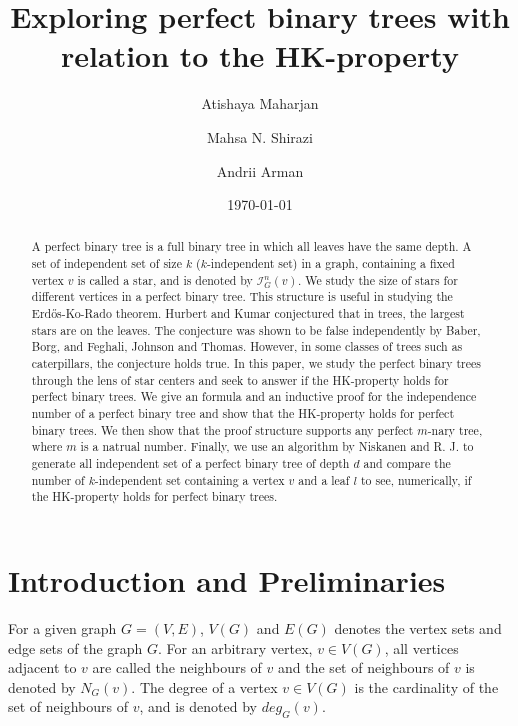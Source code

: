 \documentclass{amsart}
\title[]{Exploring perfect binary trees with relation to the HK-property}
\author[Atishaya Maharjan]{Atishaya Maharjan} \email[Atishaya Maharjan]{maharjaa@myumanitoba.ca}
\author[M.~N.~Shirazi]{Mahsa N. Shirazi} \email[M.~N.~Shirazi]{mahsa.nasrollahi@gmail.com}
\author[Andrii Arman]{Andrii Arman} \email[Andrii Arman]{andrii.arman@umanitoba.ca}
\date{\today}
\theoremstyle{definition}
\begin{document}
\begin{abstract}
	A perfect binary tree is a full binary tree in which all leaves have the same depth. A set of independent set of size $k$ ($k$-independent set) in a graph, containing a fixed vertex $v$ is called a star, and is denoted by $\mathcal{I}^n_G(v)$. We study the size of stars for different vertices in a perfect binary tree. This structure is useful in studying the Erd\H{o}s-Ko-Rado theorem. Hurbert and Kumar conjectured that in trees, the largest stars are on the leaves. The conjecture was shown to be false independently by Baber, Borg, and Feghali, Johnson and Thomas. However, in some classes of trees such as caterpillars, the conjecture holds true. In this paper, we study the perfect binary trees through the lens of star centers and seek to answer if the HK-property holds for perfect binary trees. We give an formula and an inductive proof for the independence number of a perfect binary tree and show that the HK-property holds for perfect binary trees. We then show that the proof structure supports any perfect $m$-nary tree, where $m$ is a natrual number. Finally, we use an algorithm by Niskanen and R. J. to generate all independent set of a perfect binary tree of depth $d$ and compare the number of $k$-independent set containing a vertex $v$ and a leaf $l$ to see, numerically, if the HK-property holds for perfect binary trees.
\end{abstract}

\maketitle

\section{Introduction and Preliminaries}
For a given graph $G = (V,E)$, $V(G)$ and $E(G)$ denotes the vertex sets and edge sets of the graph $G$. For an arbitrary vertex, $v \in V(G)$, all vertices adjacent to $v$ are called the neighbours of $v$ and the set of neighbours of $v$ is denoted by $N_G(v)$. The degree of a vertex $v \in V(G)$ is the cardinality of the set of neighbours of $v$, and is denoted by $deg_G(v)$.
\end{document}
